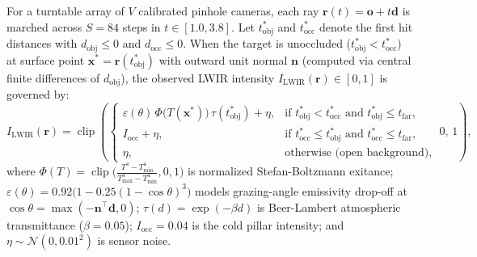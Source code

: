 \documentclass[12pt,letterpaper]{article}
\begin{document}
For a turntable array of $V$ calibrated pinhole cameras, each ray $\mathbf{r}(t) = \mathbf{o} + t\mathbf{d}$ is marched across $S = 84$ steps in $t \in [1.0, 3.8]$. Let $t_{\text{obj}}^*$ and $t_{\text{occ}}^*$ denote the first hit distances with $d_{\text{obj}} \le 0$ and $d_{\text{occ}} \le 0$. When the target is unoccluded ($t_{\text{obj}}^* < t_{\text{occ}}^*$) at surface point $\mathbf{x}^* = \mathbf{r}(t_{\text{obj}}^*)$ with outward unit normal $\mathbf{n}$ (computed via central finite differences of $d_{\text{obj}}$), the observed LWIR intensity $I_{\text{LWIR}}(\mathbf{r}) \in [0, 1]$ is governed by:
\begin{equation}
  I_{\text{LWIR}}(\mathbf{r}) = \operatorname{clip}\!\left(
    \begin{cases}
      \varepsilon(\theta)\, \Phi\!\big(T(\mathbf{x}^*)\big)\, \tau(t_{\text{obj}}^*) + \eta, & \text{if } t_{\text{obj}}^* < t_{\text{occ}}^* \text{ and } t_{\text{obj}}^* \le t_{\text{far}}, \\[2pt]
      I_{\text{occ}} + \eta, & \text{if } t_{\text{occ}}^* \le t_{\text{obj}}^* \text{ and } t_{\text{occ}}^* \le t_{\text{far}}, \\[2pt]
      \eta, & \text{otherwise (open background)},
    \end{cases}
  \; 0,\, 1\right),
  \label{eq:lwir_radiative_transfer}
\end{equation}
where $\Phi(T) = \operatorname{clip}\!\big(\frac{T^4 - T_{\text{min}}^4}{T_{\text{max}}^4 - T_{\text{min}}^4}, 0, 1\big)$ is normalized Stefan-Boltzmann exitance; $\varepsilon(\theta) = 0.92\big(1 - 0.25(1 - \cos\theta)^3\big)$ models grazing-angle emissivity drop-off at $\cos\theta = \max(-\mathbf{n}^\top \mathbf{d}, 0)$; $\tau(d) = \exp(-\beta d)$ is Beer-Lambert atmospheric transmittance ($\beta = 0.05$); $I_{\text{occ}} = 0.04$ is the cold pillar intensity; and $\eta \sim \mathcal{N}(0, 0.01^2)$ is sensor noise.
\end{document}
